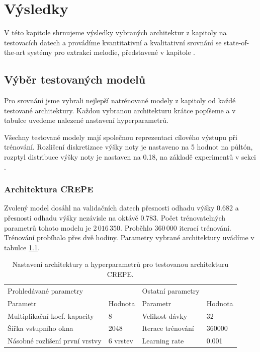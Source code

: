 \chapter{Výsledky}\label{cha:vysledky}

V této kapitole shrnujeme výsledky vybraných architektur z kapitoly  na testovacích datech a provádíme kvantitativní a kvalitativní srovnání se state-of-the-art systémy pro extrakci melodie, představené v kapitole .

\section{Výběr testovaných modelů}

Pro srovnání jsme vybrali nejlepší natrénované modely z kapitoly  od každé testované architektury. Každou vybranou architekturu krátce popíšeme a v tabulce uvedeme nalezené nastavení hyperparametrů.

Všechny testované modely mají společnou reprezentaci cílového výstupu při trénování. Rozlišení diskretizace výšky noty je nastaveno na 5 hodnot na půltón, rozptyl distribuce výšky noty je nastaven na 0.18, na základě experimentů v sekci .

\subsection{Architektura CREPE}

Zvolený model dosáhl na validačních datech přesnosti odhadu výšky 0.682 a přesnosti odhadu výšky nezávisle na oktávě 0.783. Počet trénovatelných parametrů tohoto modelu je $2\,016\,350$. Proběhlo $360\,000$ iterací trénování. Trénování probíhalo přes dvě hodiny. Parametry vybrané architektury uvádíme v tabulce \ref{tab:crepe_hyperparams}.

\begin{table}[p]
\centering
\begin{tabular}{llll}
\toprule
Prohledávané parametry               &          & Ostatní parametry &         \\
Parametr                             & Hodnota  & Parametr          & Hodnota \\
\midrule
Multiplikační koef. kapacity         & 8        & Velikost dávky    & 32      \\
Šířka vstupního okna                 & 2048     & Iterace trénování & 360000         \\
Násobné rozlišení první vrstvy       & 6 vrstev & Learning rate     & 0.001   \\
\bottomrule
\end{tabular}
\caption{Nastavení architektury a hyperparametrů pro testovanou architekturu CREPE.}\label{tab:crepe_hyperparams}
\end{table}


